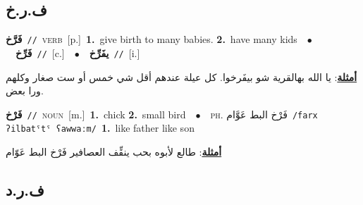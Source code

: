 \documentclass[10pt,a4paper,twoside]{article} %
\begin{document}
\begin{multicols}{2}
\vspace{-3mm}
\subsection*{\color{blue}\foreignlanguage{arabic}{ف.ر.خ}\color{blue}{}} 

{\setlength\topsep{0pt}\textbf{\foreignlanguage{arabic}{فَرَّخ}}\ {\color{gray}\texttt{//}\color{black}}\ \textsc{verb}\ [p.]\ \textbf{1.}~give birth to many babies.  \textbf{2.}~have many kids\ \ $\bullet$\ \ \setlength\topsep{0pt}\textbf{\foreignlanguage{arabic}{فَرِّخ}}\ {\color{gray}\texttt{//}\color{black}}\ [c.]\ \ $\bullet$\ \ \setlength\topsep{0pt}\textbf{\foreignlanguage{arabic}{يفَرِّخ}}\ {\color{gray}\texttt{//}\color{black}}\ [i.]\  \begin{flushright}\color{gray}\foreignlanguage{arabic}{\textbf{\underline{\foreignlanguage{arabic}{أمثلة}}}: يا الله بهالقرية شو بيفَرخوا. كل عيلة عندهم أقل شي خمس أو ست صغار وكلهم ورا بعض.}\end{flushright}\color{black}} \vspace{2mm}

{\setlength\topsep{0pt}\textbf{\foreignlanguage{arabic}{فَرْخ}}\ {\color{gray}\texttt{//}\color{black}}\ \textsc{noun}\ [m.]\ \textbf{1.}~chick  \textbf{2.}~small bird\ \ $\bullet$\ \ \textsc{ph.} \color{gray} \foreignlanguage{arabic}{فَرْخ البط عَوَّام}\color{black}\ {\color{gray}\texttt{/{\sffamily farx ʔilbatˤtˤ ʕawwaːm}/}\color{black}}\ \textbf{1.}~like father like son\  \begin{flushright}\color{gray}\foreignlanguage{arabic}{\textbf{\underline{\foreignlanguage{arabic}{أمثلة}}}: طالع لأبوه بحب ينقِّف العصافير فَرْخ البط عَوّام}\end{flushright}\color{black}} \vspace{2mm}

\vspace{-3mm}
\subsection*{\color{blue}\foreignlanguage{arabic}{ف.ر.د}\color{blue}{}} 


\end{multicols}
\end{document}
